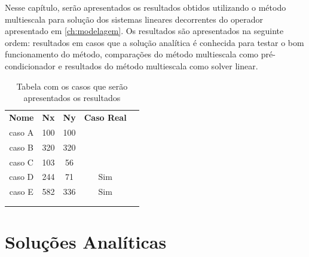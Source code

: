 Nesse capítulo, serão apresentados os resultados obtidos utilizando o método multiescala para solução dos sistemas lineares decorrentes do operador apresentado em \ref{ch:modelagem}. Os resultados são apresentados na seguinte ordem: resultados em casos que a solução analítica é conhecida para testar o bom funcionamento do método, comparações do método multiescala como pré-condicionador e resultados do método multiescala como solver linear.



\begin{table}[]
\caption{Tabela com os casos que serão apresentados os resultados}
\centering
\begin{tabular}{ccccl}
\cline{1-4}
\multicolumn{1}{|c|}{\textbf{Nome}} & \multicolumn{1}{c|}{\textbf{Nx}} & \multicolumn{1}{c|}{\textbf{Ny}} & \multicolumn{1}{c|}{\textbf{Caso Real}} &  \\ \cline{1-4}
\multicolumn{1}{|c|}{caso A}        & \multicolumn{1}{c|}{100}         & \multicolumn{1}{c|}{100}         & \multicolumn{1}{c|}{}                   &  \\ \cline{1-4}
\multicolumn{1}{|c|}{caso B}        & \multicolumn{1}{c|}{320}         & \multicolumn{1}{c|}{320}         & \multicolumn{1}{c|}{}                   &  \\ \cline{1-4}
\multicolumn{1}{|c|}{caso C}        & \multicolumn{1}{c|}{103}         & \multicolumn{1}{c|}{56}          & \multicolumn{1}{c|}{}                   &  \\ \cline{1-4}
\multicolumn{1}{|c|}{caso D}        & \multicolumn{1}{c|}{244}            & \multicolumn{1}{c|}{71}            & \multicolumn{1}{c|}{Sim}                &  \\ \cline{1-4}
\multicolumn{1}{|c|}{caso  E}       & \multicolumn{1}{c|}{582}         & \multicolumn{1}{c|}{336}         & \multicolumn{1}{c|}{Sim}                &  \\ \cline{1-4}
\multicolumn{1}{l}{}                & \multicolumn{1}{l}{}             & \multicolumn{1}{l}{}             & \multicolumn{1}{l}{}                    &  \\
\multicolumn{1}{l}{}                & \multicolumn{1}{l}{}             & \multicolumn{1}{l}{}             & \multicolumn{1}{l}{}                    & 
\end{tabular}
\end{table}


\section{Soluções Analíticas}

